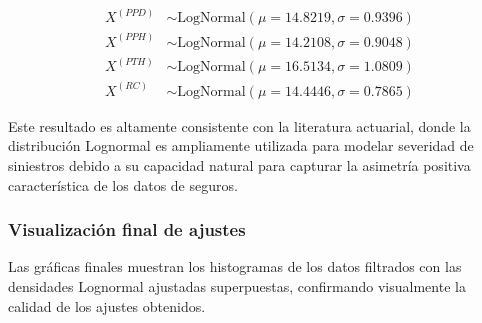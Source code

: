 \begin{align*}
X^{(PPD)} &\sim \text{LogNormal}(\mu = 14.8219, \sigma = 0.9396)\\
X^{(PPH)} &\sim \text{LogNormal}(\mu = 14.2108, \sigma = 0.9048)\\
X^{(PTH)} &\sim \text{LogNormal}(\mu = 16.5134, \sigma = 1.0809)\\
X^{(RC)} &\sim \text{LogNormal}(\mu = 14.4446, \sigma = 0.7865)
\end{align*}

Este resultado es altamente consistente con la literatura actuarial, donde la distribución Lognormal es ampliamente utilizada para modelar severidad de siniestros debido a su capacidad natural para capturar la asimetría positiva característica de los datos de seguros.

\subsubsection{Visualización final de ajustes}

Las gráficas finales muestran los histogramas de los datos filtrados con las densidades Lognormal ajustadas superpuestas, confirmando visualmente la calidad de los ajustes obtenidos.

